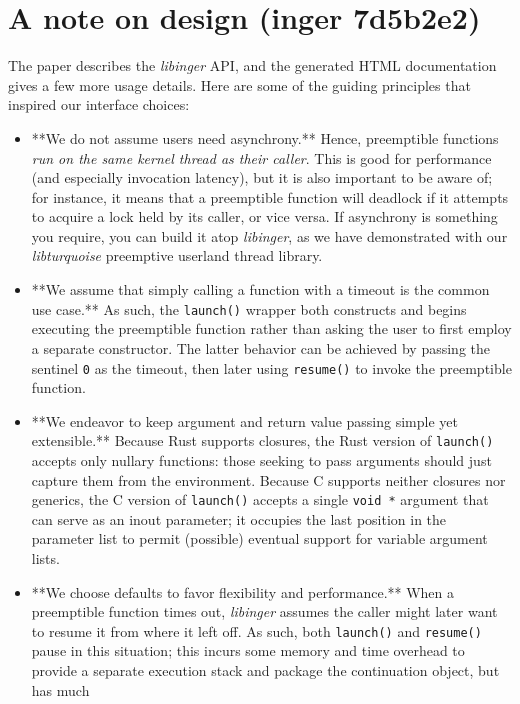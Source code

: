 \documentclass[12pt,letterpaper,openright]{report}
\begin{document}
\section{A note on design (inger 7d5b2e2)}

The paper describes the \textit{libinger} API, and the generated HTML documentation gives a few more usage
details.  Here are some of the guiding principles that inspired our interface choices:
\begin{itemize}
\item **We do not assume users need asynchrony.**  Hence, preemptible functions \textit{run on the same kernel
	thread as their caller}.  This is good for performance (and especially invocation latency), but
	it is also important to be aware of; for instance, it means that a preemptible function will
	deadlock if it attempts to acquire a lock held by its caller, or vice versa.  If asynchrony is
	something you require, you can build it atop \textit{libinger}, as we have demonstrated with our
	\textit{libturquoise} preemptive userland thread library.
\item **We assume that simply calling a function with a timeout is the common use case.**  As such, the
	\texttt{launch()} wrapper both constructs and begins executing the preemptible function rather than
	asking the user to first employ a separate constructor.  The latter behavior can be achieved by
	passing the sentinel \texttt{0} as the timeout, then later using \texttt{resume()} to invoke the preemptible
	function.
\item **We endeavor to keep argument and return value passing simple yet extensible.**  Because Rust
	supports closures, the Rust version of \texttt{launch()} accepts only nullary functions: those seeking
	to pass arguments should just capture them from the environment.  Because C supports neither
	closures nor generics, the C version of \texttt{launch()} accepts a single \texttt{void *} argument that can
	serve as an inout parameter; it occupies the last position in the parameter list to permit
	(possible) eventual support for variable argument lists.
\item **We choose defaults to favor flexibility and performance.**  When a preemptible function times
	out, \textit{libinger} assumes the caller might later want to resume it from where it left off.  As
	such, both \texttt{launch()} and \texttt{resume()} pause in this situation; this incurs some memory and time
	overhead to provide a separate execution stack and package the continuation object, but has much

\end{itemize}
\end{document}
